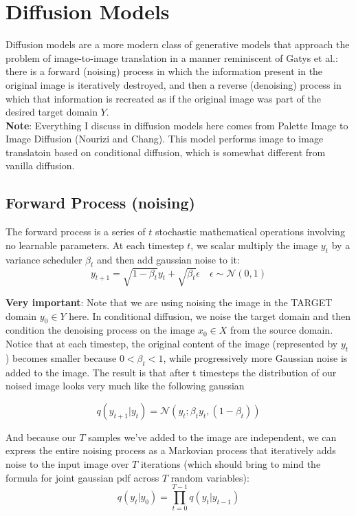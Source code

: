 \documentclass[12pt]{article}
\begin{document}
\section{Diffusion Models}

Diffusion models are a more modern class of generative models that approach the problem of image-to-image translation in a manner reminiscent of Gatys et al.: there is a forward (noising) process in which the information present in the original image is iteratively destroyed, and then a reverse (denoising) process in which that information is recreated as if the original image was part of the desired target domain \(Y\). \\

\textbf{Note}: Everything I discuss in diffusion models here comes from Palette Image to Image Diffusion (Nourizi and Chang). This model performs image to image translatoin based on conditional diffusion, which is somewhat different from vanilla diffusion. 

\subsection{Forward Process (noising)}
The forward process is a series of \(t\) stochastic mathematical operations involving no learnable parameters. At each timestep \(t\), we scalar multiply the image \(y_{t}\) by a variance scheduler \(\beta_{t}\) and then add gaussian noise to it:
\[y_ {t+1} = \sqrt{1-\beta_t}y_{t} + \sqrt{\beta_t}\epsilon \quad \epsilon \sim \mathcal{N}(0,1)\]

\textbf{Very important}: Note that we are using noising the image in the TARGET domain \(y_0 \in Y\) here. In conditional diffusion, we noise the target domain and then condition the denoising process on the image \(x_0 \in X\) from the source domain. \\

Notice that at each timestep, the original content of the image (represented by \(y_t\)) becomes smaller because \(0 < \beta_t < 1\), while progressively more Gaussian noise is added to the image. The result is that after t timesteps the distribution of our noised image looks very much like the following gaussian

\[q(y_{t+1}|y_t) = \mathcal{N}(y_t; \beta_ty_t, (1-\beta_t))\]

And because our \(T\) samples we've added to the image are independent, we can express the entire noising process as a Markovian process that iteratively adds noise to the input image over \(T\) iterations (which should bring to mind the formula for joint gaussian pdf across \(T\) random variables):
\[q(y_t | y_{0}) = \prod_{t=0}^{T-1}q(y_t | y_{t-1})\]
\end{document}
